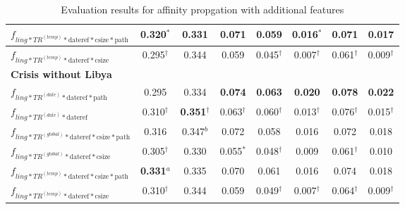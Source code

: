 \documentclass[a4paper,BCOR=10mm]{report}
\numberwithin{lemma}{chapter}
\numberwithin{definition}{chapter}
\begin{document}
\begin{table}
\begin{tabular}{|l|c|cc|cc|cc|}
$f_{ling*TR^{(temp)}*\text{dateref}*\text{csize}*\text{path}}$   & \textbf{0.320}$^{*}$ & 0.331 & 0.071 & 0.059 & 0.016$^{*}$   & 0.071 & 0.017 \\\hline
$f_{ling*TR^{(temp)}*\text{dateref}*\text{csize}}$   & 0.295$^{\dagger}$    & 0.344 & 0.059 & 0.045$^{\dagger}$ & 0.007$^{\dagger}$ & 0.061$^{\dagger}$ & 0.009$^{\dagger}$ \\\hline
\hline\multicolumn{8}{|l|}{ \textbf{Crisis without Libya}}\\\hline
$f_{ling*TR^{(date)}*\text{dateref}*\text{path}}$    & 0.295    & 0.334 & \textbf{0.074}    & \textbf{0.063}    & \textbf{0.020}    & \textbf{0.078}    & \textbf{0.022} \\\hline
$f_{ling*TR^{(date)}*\text{dateref}}$    & 0.310$^{\dagger}$    & \textbf{0.351}$^{\dagger}$    & 0.063$^{\dagger}$ & 0.060$^{\dagger}$ & 0.013$^{\dagger}$ & 0.076$^{\dagger}$ & 0.015$^{\dagger}$ \\\hline
$f_{ling*TR^{(global)}*\text{dateref}*\text{csize}*\text{path}}$     & 0.316    & 0.347$^{b}$   & 0.072 & 0.058 & 0.016 & 0.072 & 0.018 \\\hline
$f_{ling*TR^{(global)}*\text{dateref}*\text{csize}}$     & 0.305$^{\dagger}$    & 0.330 & 0.055$^{*}$   & 0.048$^{\dagger}$ & 0.009 & 0.061$^{\dagger}$ & 0.010 \\\hline
$f_{ling*TR^{(temp)}*\text{dateref}*\text{csize}*\text{path}}$   & \textbf{0.331}$^{a}$ & 0.335 & 0.070 & 0.061 & 0.016 & 0.074 & 0.018 \\\hline
$f_{ling*TR^{(temp)}*\text{dateref}*\text{csize}}$   & 0.310$^{\dagger}$    & 0.344 & 0.059 & 0.049$^{\dagger}$ & 0.007$^{\dagger}$ & 0.064$^{\dagger}$ & 0.009$^{\dagger}$ \\\hline\end{tabular}
\caption{Evaluation results for affinity propgation with additional features}
\label{tab:results-features}

\end{table}
\end{document}
